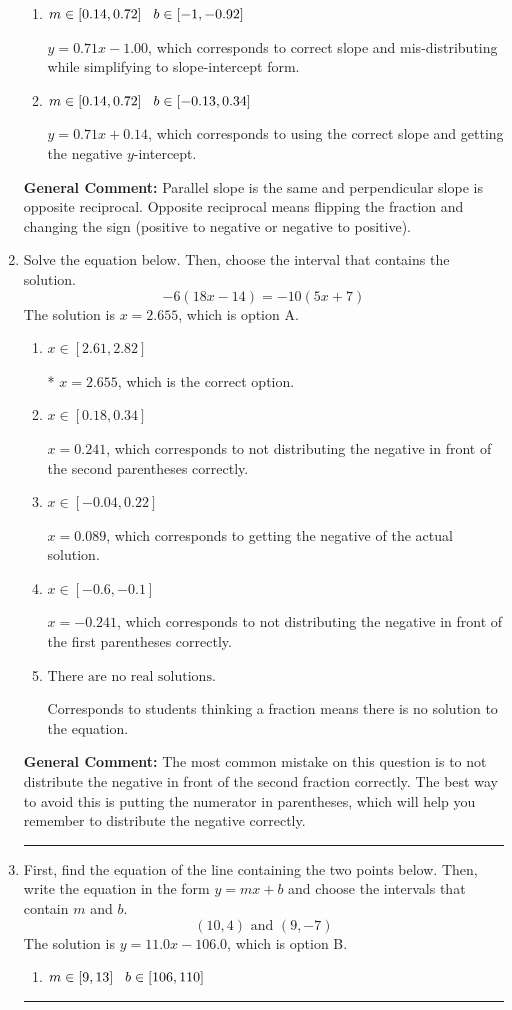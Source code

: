 \documentclass{extbook}[14pt]
\newcommand{\litem}[1]{\item #1

\rule{\textwidth}{0.4pt}}
\begin{document}
\begin{enumerate}
{\begin{enumerate}[label=\Alph*.]
 $y = -0.71x + 4.14$, which corresponds to using the negative slope.
\item \( m \in [0.14, 0.72] \hspace*{3mm} b \in [-1, -0.92] \)

 $y = 0.71x - 1.00$, which corresponds to correct slope and mis-distributing while simplifying to slope-intercept form.
\item \( m \in [0.14, 0.72] \hspace*{3mm} b \in [-0.13, 0.34] \)

 $y = 0.71x + 0.14$, which corresponds to using the correct slope and getting the negative $y$-intercept.
\end{enumerate}

\textbf{General Comment:} Parallel slope is the same and perpendicular slope is opposite reciprocal. Opposite reciprocal means flipping the fraction and changing the sign (positive to negative or negative to positive).
}
\litem{
Solve the equation below. Then, choose the interval that contains the solution.
\[ -6(18x -14) = -10(5x + 7) \]The solution is \( x = 2.655 \), which is option A.\begin{enumerate}[label=\Alph*.]
\item \( x \in [2.61, 2.82] \)

* $x = 2.655$, which is the correct option.
\item \( x \in [0.18, 0.34] \)

$x = 0.241$, which corresponds to not distributing the negative in front of the second parentheses correctly.
\item \( x \in [-0.04, 0.22] \)

$x = 0.089$, which corresponds to getting the negative of the actual solution.
\item \( x \in [-0.6, -0.1] \)

$x = -0.241$, which corresponds to not distributing the negative in front of the first parentheses correctly.
\item \( \text{There are no real solutions.} \)

Corresponds to students thinking a fraction means there is no solution to the equation.
\end{enumerate}

\textbf{General Comment:} The most common mistake on this question is to not distribute the negative in front of the second fraction correctly. The best way to avoid this is putting the numerator in parentheses, which will help you remember to distribute the negative correctly.
}
\litem{
First, find the equation of the line containing the two points below. Then, write the equation in the form $ y=mx+b $ and choose the intervals that contain $m$ and $b$.
\[ (10, 4) \text{ and } (9, -7) \]The solution is \( y = 11.0x -106.0 \), which is option B.\begin{enumerate}[label=\Alph*.]
\item \( m \in [9, 13] \hspace*{3mm} b \in [106, 110] \)


\end{enumerate}}
\end{enumerate}
\end{document}
